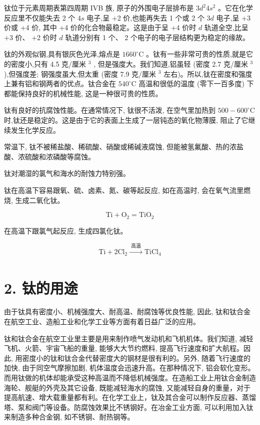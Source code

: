 \documentclass[10pt]{article}
\begin{document}
钛位于元素周期表第四周期 IVB 族, 原子的外围电子层排布是 \(3{d}^{2}4{s}^{2}\) 。它在化学反应里不仅能失去 2 个 \({4s}\) 电子,呈 +2 价,也能再失去 1 个或 2 个 \({3d}\) 电子,呈 +3 价或 +4 价, 其中 +4 价的化合物最稳定。这是由于呈 +4 价时 \(d\) 轨道全空,比呈 +3 价、 +2 价时 \(d\) 轨道分别有 1 个、 2 个电子的电子层结构更为稳定的缘故。

钛的外观似钢,具有银灰色光泽,熔点是 \({1660}^{ \circ }\mathrm{C}\) 。钛有一些非常可贵的性质,就是它的密度小,只有 4.5 克/厘米 \({}^{3}\) , 但是强度大。我们知道,铝虽轻 (密度 2.7 克/厘米 \({}^{3}\) ),但强度差; 钢强度虽大,但太重 (密度 7.9 克/厘米 \({}^{3}\) 左右)。所以,钛在密度和强度上兼有铝和钢两者的优点。钛合金在 \({540}^{ \circ }\mathrm{C}\) 高温和很低的温度 (零下一百多度) 下都能保持良好的机械性能, 这是一种很可贵的性质。

钛有良好的抗腐蚀性能。在通常情况下, 钛很不活泼, 在空气里加热到 \({500} - {600}^{ \circ }\mathrm{C}\) 时,钛还是稳定的。这是由于它的表面上生成了一层钝态的氧化物薄膜, 阻止了它继续发生化学反应。

常温下, 钛不被稀盐酸、稀硫酸、硝酸或稀碱液腐蚀, 但能被氢氟酸、热的浓盐酸、浓硫酸和浓磷酸等腐蚀。

钛对潮湿的氯气和海水的耐蚀力特别强。

钛在高温下容易跟氧、硫、卤素、氮、碳等起反应, 如在高温时, 会在氧气流里燃烧, 生成二氧化钛。

\[
\mathrm{{Ti}} + {\mathrm{O}}_{2} = {\mathrm{{TiO}}}_{2}
\]

在高温下跟氯气起反应, 生成四氯化钛。

\[
\mathrm{{Ti}} + 2{\mathrm{{Cl}}}_{2}\xrightarrow[]{\text{ 高温 }}{\mathrm{{TiCl}}}_{4}
\]

\section*{2. 钛的用途}

由于钛具有密度小、机械强度大、耐高温、耐腐蚀等优良性能, 因此, 钛和钛合金在航空工业、造船工业和化学工业等方面有着日益广泛的应用。

钛和钛合金在航空工业里主要是用来制作喷气发动机和飞机机体。我们知道, 减轻飞机、火箭、宇宙飞船的重量, 能够大大节约燃料, 提高飞行速度和扩大航程。因此, 用密度小的钛和钛合金代替密度大的钢材是很有利的。另外, 随着飞行速度的加快, 由于同空气摩擦加剧, 机体温度会迅速升高。在那种情况下, 铝会软化变形。而用钛做的机体却能承受这种高温而不降低机械强度。在造船工业上用钛合金制造海轮、舰艇的外壳及其它设备, 既能减轻海水的腐蚀, 又能减轻自身的重量，对于提高航速、增大载重量都有利。在化学工业上，钛及其合金可以制作反应器、蒸馏塔、泵和阀门等设备。防腐蚀效果比不锈钢好。在冶金工业方面, 可以利用加入钛来制造多种合金钢, 如不锈钢、耐热钢等。
\end{document}
